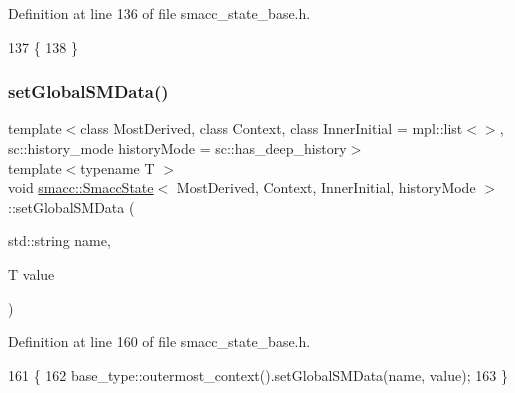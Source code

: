 Definition at line 136 of file smacc\+\_\+state\+\_\+base.\+h.


\begin{DoxyCode}
137   \{
138   \}
\end{DoxyCode}
\mbox{\label{classsmacc_1_1SmaccState_a98f2673b257479e0a3615d5d8279a591}} 
\subsubsection{\texorpdfstring{set\+Global\+S\+M\+Data()}{setGlobalSMData()}}
{\footnotesize\ttfamily template$<$class Most\+Derived, class Context, class Inner\+Initial = mpl\+::list$<$$>$, sc\+::history\+\_\+mode history\+Mode = sc\+::has\+\_\+deep\+\_\+history$>$ \\
template$<$typename T $>$ \\
void \hyperlink{classsmacc_1_1SmaccState}{smacc\+::\+Smacc\+State}$<$ Most\+Derived, Context, Inner\+Initial, history\+Mode $>$\+::set\+Global\+S\+M\+Data (\begin{DoxyParamCaption}\item[{std\+::string}]{name,  }\item[{T}]{value }\end{DoxyParamCaption})\hspace{0.3cm}{\ttfamily [inline]}}



Definition at line 160 of file smacc\+\_\+state\+\_\+base.\+h.


\begin{DoxyCode}
161   \{
162     base\_type::outermost\_context().setGlobalSMData(name, value);
163   \}
\end{DoxyCode}
\mbox{\label{classsmacc_1_1SmaccState_a1dccb401e1a99031863a21a590d953e6}} 
